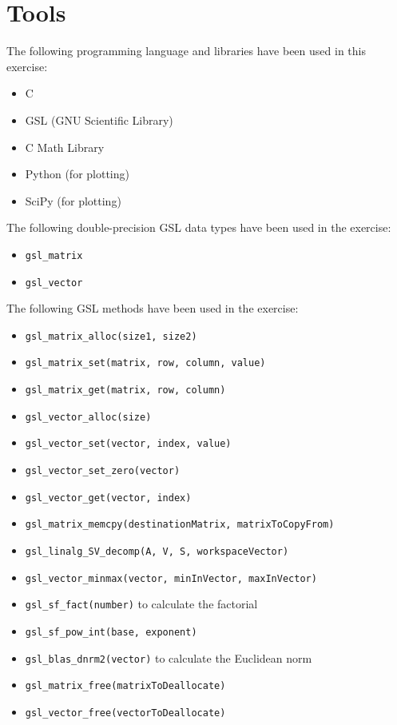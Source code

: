 \documentclass{article}
\newcommand{\code}{\texttt}
\begin{document}
\section{Tools}
The following programming language and libraries have been used in this exercise:
\begin{itemize}
  \item C
  \item GSL (GNU Scientific Library)
  \item C Math Library
  \item Python (for plotting)
  \item SciPy (for plotting)
\end{itemize}
The following double-precision GSL data types have been used in the exercise:
\begin{itemize}
  \item \code{gsl\_matrix}
  \item \code{gsl\_vector}
\end{itemize}
The following GSL methods have been used in the exercise:
\begin{itemize}
  \item \code{gsl\_matrix\_alloc(size1, size2)}
  \item \code{gsl\_matrix\_set(matrix, row, column, value)}
  \item \code{gsl\_matrix\_get(matrix, row, column)}
  \item \code{gsl\_vector\_alloc(size)}
  \item \code{gsl\_vector\_set(vector, index, value)}
  \item \code{gsl\_vector\_set\_zero(vector)}
  \item \code{gsl\_vector\_get(vector, index)}
  \item \code{gsl\_matrix\_memcpy(destinationMatrix, matrixToCopyFrom)}
  \item \code{gsl\_linalg\_SV\_decomp(A, V, S, workspaceVector)}
  \item \code{gsl\_vector\_minmax(vector, minInVector, maxInVector)}
  \item \code{gsl\_sf\_fact(number)} to calculate the factorial
  \item \code{gsl\_sf\_pow\_int(base, exponent)}
  \item \code{gsl\_blas\_dnrm2(vector)} to calculate the Euclidean norm
  \item \code{gsl\_matrix\_free(matrixToDeallocate)}
  \item \code{gsl\_vector\_free(vectorToDeallocate)}
\end{itemize}
\end{document}
